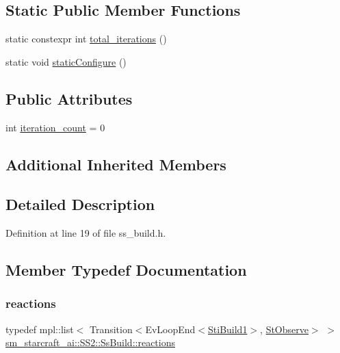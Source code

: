 \subsection*{Static Public Member Functions}
\begin{DoxyCompactItemize}
\item 
static constexpr int \hyperlink{structsm__starcraft__ai_1_1SS2_1_1SsBuild_a2f1a89dd07833fdcec8e3a80b1b8af86}{total\+\_\+iterations} ()
\item 
static void \hyperlink{structsm__starcraft__ai_1_1SS2_1_1SsBuild_ae3e7448868c67c307e71f04a04e08139}{static\+Configure} ()
\end{DoxyCompactItemize}
\subsection*{Public Attributes}
\begin{DoxyCompactItemize}
\item 
int \hyperlink{structsm__starcraft__ai_1_1SS2_1_1SsBuild_abd2de17a6f6647b5c3da117b4ac7d02b}{iteration\+\_\+count} = 0
\end{DoxyCompactItemize}
\subsection*{Additional Inherited Members}


\subsection{Detailed Description}


Definition at line 19 of file ss\+\_\+build.\+h.



\subsection{Member Typedef Documentation}
\mbox{\label{structsm__starcraft__ai_1_1SS2_1_1SsBuild_a62244400be4af9006d440fb0f099dcc5}} 
\subsubsection{\texorpdfstring{reactions}{reactions}}
{\footnotesize\ttfamily typedef mpl\+::list$<$ Transition$<$Ev\+Loop\+End$<$\hyperlink{structsm__starcraft__ai_1_1build__inner__states_1_1StiBuild1}{Sti\+Build1}$>$, \hyperlink{structsm__starcraft__ai_1_1StObserve}{St\+Observe}$>$ $>$ \hyperlink{structsm__starcraft__ai_1_1SS2_1_1SsBuild_a62244400be4af9006d440fb0f099dcc5}{sm\+\_\+starcraft\+\_\+ai\+::\+S\+S2\+::\+Ss\+Build\+::reactions}}



